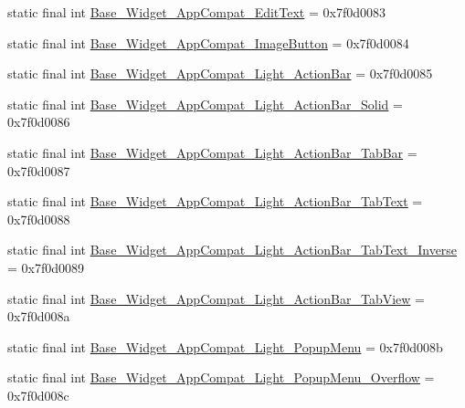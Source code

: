 \begin{DoxyCompactItemize}
\item 
static final int \mbox{\hyperlink{classcom_1_1synnapps_1_1carouselview_1_1_r_1_1style_acc60d0ece36be8c474055265d8448856}{Base\+\_\+\+Widget\+\_\+\+App\+Compat\+\_\+\+Edit\+Text}} = 0x7f0d0083
\item 
static final int \mbox{\hyperlink{classcom_1_1synnapps_1_1carouselview_1_1_r_1_1style_ae64be2cc0bcb428571a1f9d7d133c2eb}{Base\+\_\+\+Widget\+\_\+\+App\+Compat\+\_\+\+Image\+Button}} = 0x7f0d0084
\item 
static final int \mbox{\hyperlink{classcom_1_1synnapps_1_1carouselview_1_1_r_1_1style_ac345abd4690f2250db2e023f5f858718}{Base\+\_\+\+Widget\+\_\+\+App\+Compat\+\_\+\+Light\+\_\+\+Action\+Bar}} = 0x7f0d0085
\item 
static final int \mbox{\hyperlink{classcom_1_1synnapps_1_1carouselview_1_1_r_1_1style_a62f6678e7d63626235f0b464f9acb1b8}{Base\+\_\+\+Widget\+\_\+\+App\+Compat\+\_\+\+Light\+\_\+\+Action\+Bar\+\_\+\+Solid}} = 0x7f0d0086
\item 
static final int \mbox{\hyperlink{classcom_1_1synnapps_1_1carouselview_1_1_r_1_1style_a5533e103939c6b00dd0efae90bf8da23}{Base\+\_\+\+Widget\+\_\+\+App\+Compat\+\_\+\+Light\+\_\+\+Action\+Bar\+\_\+\+Tab\+Bar}} = 0x7f0d0087
\item 
static final int \mbox{\hyperlink{classcom_1_1synnapps_1_1carouselview_1_1_r_1_1style_a5f83d7139a4bdb82a6ca870aa1bd91ab}{Base\+\_\+\+Widget\+\_\+\+App\+Compat\+\_\+\+Light\+\_\+\+Action\+Bar\+\_\+\+Tab\+Text}} = 0x7f0d0088
\item 
static final int \mbox{\hyperlink{classcom_1_1synnapps_1_1carouselview_1_1_r_1_1style_a9382a1679a14a531921287be374a21be}{Base\+\_\+\+Widget\+\_\+\+App\+Compat\+\_\+\+Light\+\_\+\+Action\+Bar\+\_\+\+Tab\+Text\+\_\+\+Inverse}} = 0x7f0d0089
\item 
static final int \mbox{\hyperlink{classcom_1_1synnapps_1_1carouselview_1_1_r_1_1style_a576d768527acc331ffc45ca0da446290}{Base\+\_\+\+Widget\+\_\+\+App\+Compat\+\_\+\+Light\+\_\+\+Action\+Bar\+\_\+\+Tab\+View}} = 0x7f0d008a
\item 
static final int \mbox{\hyperlink{classcom_1_1synnapps_1_1carouselview_1_1_r_1_1style_a577624727103fa83129a92a3c7e2d886}{Base\+\_\+\+Widget\+\_\+\+App\+Compat\+\_\+\+Light\+\_\+\+Popup\+Menu}} = 0x7f0d008b
\item 
static final int \mbox{\hyperlink{classcom_1_1synnapps_1_1carouselview_1_1_r_1_1style_a10243eb007914657c3ab48bcd6eae48e}{Base\+\_\+\+Widget\+\_\+\+App\+Compat\+\_\+\+Light\+\_\+\+Popup\+Menu\+\_\+\+Overflow}} = 0x7f0d008c

\end{DoxyCompactItemize}
